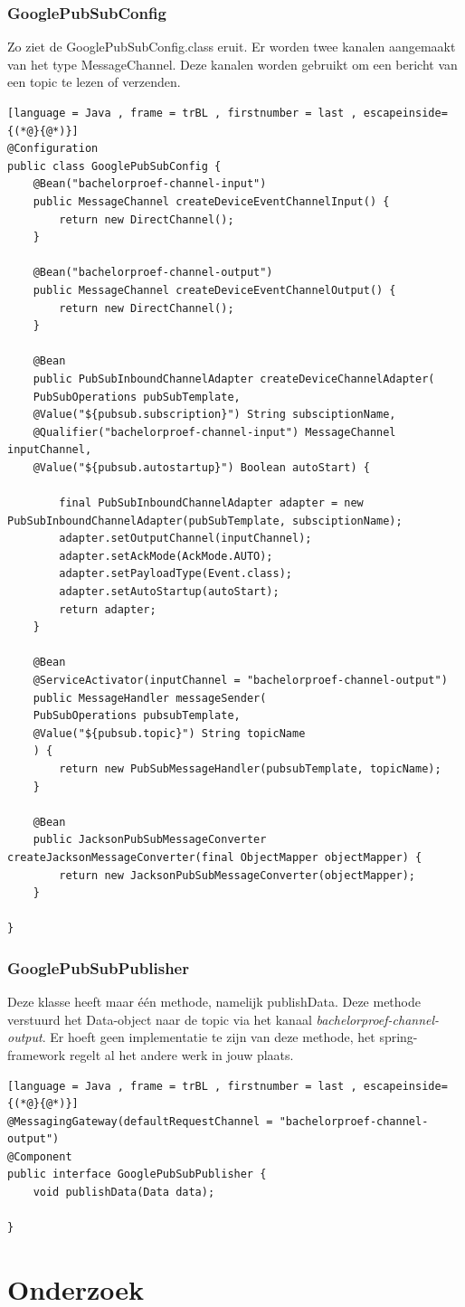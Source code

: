 \subsubsection{GooglePubSubConfig}
Zo ziet de GooglePubSubConfig.class eruit. Er worden twee kanalen aangemaakt van het type MessageChannel. Deze kanalen worden gebruikt om een bericht van een topic te lezen of verzenden.
        \begin{lstlisting}[language = Java , frame = trBL , firstnumber = last , escapeinside={(*@}{@*)}]
@Configuration
public class GooglePubSubConfig {
    @Bean("bachelorproef-channel-input")
    public MessageChannel createDeviceEventChannelInput() {
        return new DirectChannel();
    }
    
    @Bean("bachelorproef-channel-output")
    public MessageChannel createDeviceEventChannelOutput() {
        return new DirectChannel();
    }
    
    @Bean
    public PubSubInboundChannelAdapter createDeviceChannelAdapter(
    PubSubOperations pubSubTemplate,
    @Value("${pubsub.subscription}") String subsciptionName,
    @Qualifier("bachelorproef-channel-input") MessageChannel inputChannel,
    @Value("${pubsub.autostartup}") Boolean autoStart) {
        
        final PubSubInboundChannelAdapter adapter = new PubSubInboundChannelAdapter(pubSubTemplate, subsciptionName);
        adapter.setOutputChannel(inputChannel);
        adapter.setAckMode(AckMode.AUTO);
        adapter.setPayloadType(Event.class);
        adapter.setAutoStartup(autoStart);
        return adapter;
    }
    
    @Bean
    @ServiceActivator(inputChannel = "bachelorproef-channel-output")
    public MessageHandler messageSender(
    PubSubOperations pubsubTemplate,
    @Value("${pubsub.topic}") String topicName
    ) {
        return new PubSubMessageHandler(pubsubTemplate, topicName);
    }
    
    @Bean
    public JacksonPubSubMessageConverter createJacksonMessageConverter(final ObjectMapper objectMapper) {
        return new JacksonPubSubMessageConverter(objectMapper);
    }
    
}
     \end{lstlisting}
\subsubsection{GooglePubSubPublisher}
Deze klasse heeft maar één methode, namelijk publishData. Deze methode verstuurd het Data-object naar de topic via het kanaal \emph{bachelorproef-channel-output}. Er hoeft geen implementatie te zijn van deze methode, het spring-framework regelt al het andere werk in jouw plaats.
        \begin{lstlisting}[language = Java , frame = trBL , firstnumber = last , escapeinside={(*@}{@*)}]
@MessagingGateway(defaultRequestChannel = "bachelorproef-channel-output")
@Component
public interface GooglePubSubPublisher {
    void publishData(Data data);
    
}
     \end{lstlisting}
\section{Onderzoek}

